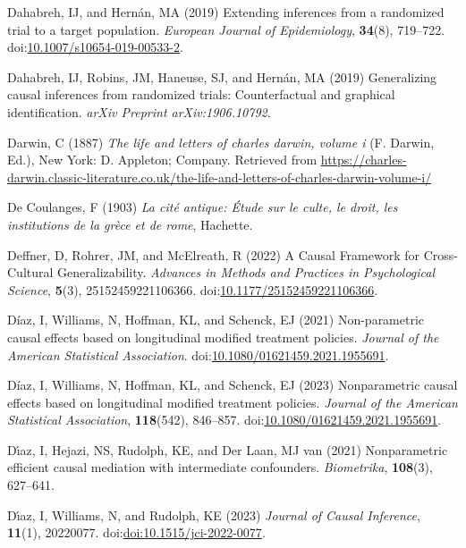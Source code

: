 \documentclass[
  single column]{article}
\newlength{\cslhangindent}
\newenvironment{CSLReferences}[2] %
 {\begin{list}{}{%
  \setlength{\itemindent}{0pt}
  \setlength{\leftmargin}{0pt}
  \setlength{\parsep}{0pt}
  \ifodd #1
   \setlength{\leftmargin}{\cslhangindent}
   \setlength{\itemindent}{-1\cslhangindent}
  \fi
  \setlength{\itemsep}{#2\baselineskip}}}
 {\end{list}}
\begin{document}
\begin{CSLReferences}{1}{0}
Dahabreh, IJ, and Hernán, MA (2019) Extending inferences from a
randomized trial to a target population. \emph{European Journal of
Epidemiology}, \textbf{34}(8), 719--722.
doi:\href{https://doi.org/10.1007/s10654-019-00533-2}{10.1007/s10654-019-00533-2}.

Dahabreh, IJ, Robins, JM, Haneuse, SJ, and Hernán, MA (2019)
Generalizing causal inferences from randomized trials: Counterfactual
and graphical identification. \emph{arXiv Preprint arXiv:1906.10792}.

Darwin, C (1887) \emph{The life and letters of charles darwin, volume i}
(F. Darwin, Ed.), New York: D. Appleton; Company. Retrieved from
\url{https://charles-darwin.classic-literature.co.uk/the-life-and-letters-of-charles-darwin-volume-i/}

De Coulanges, F (1903) \emph{La cité antique: Étude sur le culte, le
droit, les institutions de la grèce et de rome}, Hachette.

Deffner, D, Rohrer, JM, and McElreath, R (2022) A Causal Framework for
Cross-Cultural Generalizability. \emph{Advances in Methods and Practices
in Psychological Science}, \textbf{5}(3), 25152459221106366.
doi:\href{https://doi.org/10.1177/25152459221106366}{10.1177/25152459221106366}.

Díaz, I, Williams, N, Hoffman, KL, and Schenck, EJ (2021) Non-parametric
causal effects based on longitudinal modified treatment policies.
\emph{Journal of the American Statistical Association}.
doi:\href{https://doi.org/10.1080/01621459.2021.1955691}{10.1080/01621459.2021.1955691}.

Díaz, I, Williams, N, Hoffman, KL, and Schenck, EJ (2023) Nonparametric
causal effects based on longitudinal modified treatment policies.
\emph{Journal of the American Statistical Association},
\textbf{118}(542), 846--857.
doi:\href{https://doi.org/10.1080/01621459.2021.1955691}{10.1080/01621459.2021.1955691}.

Dı́az, I, Hejazi, NS, Rudolph, KE, and Der Laan, MJ van (2021)
Nonparametric efficient causal mediation with intermediate confounders.
\emph{Biometrika}, \textbf{108}(3), 627--641.

Dı́az, I, Williams, N, and Rudolph, KE (2023) \emph{Journal of Causal
Inference}, \textbf{11}(1), 20220077.
doi:\href{https://doi.org/doi:10.1515/jci-2022-0077}{doi:10.1515/jci-2022-0077}.


\end{CSLReferences}
\end{document}
